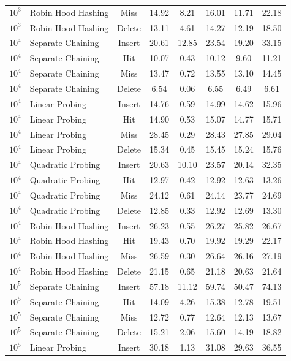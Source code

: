 \documentclass[conference]{IEEEtran}
\begin{document}
\begin{table}[t]
\begin{tabular}{llcccccc}
$10^3$ & Robin Hood Hashing & Miss & 14.92 & 8.21 & 16.01 & 11.71 & 22.18 \\
$10^3$ & Robin Hood Hashing & Delete & 13.11 & 4.61 & 14.27 & 12.19 & 18.50 \\
\midrule
$10^4$ & Separate Chaining & Insert & 20.61 & 12.85 & 23.54 & 19.20 & 33.15 \\
$10^4$ & Separate Chaining & Hit & 10.07 & 0.43 & 10.12 & 9.60 & 11.21 \\
$10^4$ & Separate Chaining & Miss & 13.47 & 0.72 & 13.55 & 13.10 & 14.45 \\
$10^4$ & Separate Chaining & Delete & 6.54 & 0.06 & 6.55 & 6.49 & 6.61 \\
$10^4$ & Linear Probing & Insert & 14.76 & 0.59 & 14.99 & 14.62 & 15.96 \\
$10^4$ & Linear Probing & Hit & 14.90 & 0.53 & 15.07 & 14.77 & 15.71 \\
$10^4$ & Linear Probing & Miss & 28.45 & 0.29 & 28.43 & 27.85 & 29.04 \\
$10^4$ & Linear Probing & Delete & 15.34 & 0.45 & 15.45 & 15.24 & 15.76 \\
$10^4$ & Quadratic Probing & Insert & 20.63 & 10.10 & 23.57 & 20.14 & 32.35 \\
$10^4$ & Quadratic Probing & Hit & 12.97 & 0.42 & 12.92 & 12.63 & 13.26 \\
$10^4$ & Quadratic Probing & Miss & 24.12 & 0.61 & 24.14 & 23.77 & 24.69 \\
$10^4$ & Quadratic Probing & Delete & 12.85 & 0.33 & 12.92 & 12.69 & 13.30 \\
$10^4$ & Robin Hood Hashing & Insert & 26.23 & 0.55 & 26.27 & 25.82 & 26.67 \\
$10^4$ & Robin Hood Hashing & Hit & 19.43 & 0.70 & 19.92 & 19.29 & 22.17 \\
$10^4$ & Robin Hood Hashing & Miss & 26.59 & 0.30 & 26.64 & 26.16 & 27.19 \\
$10^4$ & Robin Hood Hashing & Delete & 21.15 & 0.65 & 21.18 & 20.63 & 21.64 \\
\midrule
$10^5$ & Separate Chaining & Insert & 57.18 & 11.12 & 59.74 & 50.47 & 74.13 \\
$10^5$ & Separate Chaining & Hit & 14.09 & 4.26 & 15.38 & 12.78 & 19.51 \\
$10^5$ & Separate Chaining & Miss & 12.72 & 0.77 & 12.64 & 12.13 & 13.67 \\
$10^5$ & Separate Chaining & Delete & 15.21 & 2.06 & 15.60 & 14.19 & 18.82 \\
$10^5$ & Linear Probing & Insert & 30.18 & 1.13 & 31.08 & 29.63 & 36.55 \\

\end{tabular}
\end{table}
\end{document}
